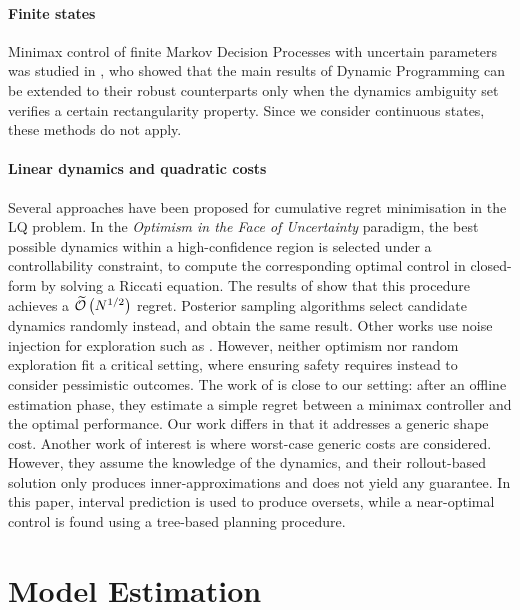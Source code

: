 \documentclass{article}
\begin{document}
\paragraph{Finite states} Minimax control of finite Markov Decision Processes with uncertain parameters was studied in \citep{Iyengar2005,Nilim2005,Wiesemann2013}, who showed that the main results of Dynamic Programming can be extended to their robust counterparts only when the dynamics ambiguity set verifies a certain rectangularity property. Since we consider continuous states, these methods do not apply.

\paragraph{Linear dynamics and quadratic costs} Several approaches have been proposed for cumulative regret minimisation in the LQ problem. In the \emph{Optimism in the Face of Uncertainty} paradigm, the best possible dynamics within a high-confidence region is selected under a controllability constraint, to compute the corresponding optimal control in closed-form by solving a Riccati equation. The results of 	\citep{abbasi-yadkori11a,Ibrahimi2013,Faradonbeh2017} show that this procedure achieves a $\widetilde{\mathcal{O}}\left(N^{1/2}\right)$ regret. Posterior sampling algorithms \citep{Ouyang2017,abeille18a} select candidate dynamics randomly instead, and obtain the same result. Other works use noise injection for exploration such as \citep{Dean2017,Dean2018}. However, neither optimism nor random exploration fit a critical setting, where ensuring safety requires instead to consider pessimistic outcomes. The work of \citet{Dean2017} is close to our setting: after an offline estimation phase, they estimate a simple regret between a minimax controller and the optimal performance. Our work differs in that it addresses a generic shape cost. 
Another work of interest is \citep{Rosolia2019} where worst-case generic costs are considered. However, they assume the knowledge of the dynamics, and their rollout-based solution only produces inner-approximations and does not yield any guarantee. In this paper, interval prediction is used to produce oversets, while a near-optimal control is found using a tree-based planning procedure.


\section{Model Estimation}

\label{sec:estimation}
\end{document}
